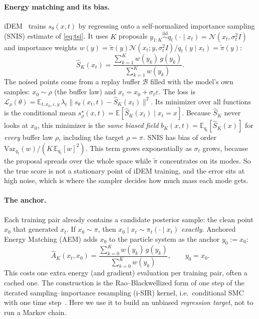 \paragraph{Energy matching and its bias.}
iDEM~\citep{akhound2024iterated} trains $s_\theta(x,t)$ by regressing onto a self-normalized importance sampling (SNIS) estimate of \eqref{eq:tsi}. It uses $K$ proposals $y_{1:K}\overset{\text{iid}}{\sim} q_t(\cdot\mid x_t)=\mathcal{N}(x_t,\sigma_t^2I)$ and importance weights $w(y)=\tilde\pi(y)\mathcal{N}(x_t;y,\sigma_t^2I)/q_t(y\mid x_t)=\tilde\pi(y)$:
\begin{equation}
\widehat S_K(x_t)=\frac{\sum_{k=1}^K w(y_k)\,g(y_k)}{\sum_{k=1}^K w(y_k)}.
\label{eq:snis}
\end{equation}
The noised points come from a replay buffer $\mathcal{B}$ filled with the model's own samples: $x_0\sim\rho$ (the buffer law) and $x_t=x_0+\sigma_t\varepsilon$.
The loss is $\mathcal{L}_\rho(\theta)=\mathbb{E}_{t,x_0,\varepsilon,y}\,\lambda_t\|s_\theta(x_t,t)-\widehat S_K(x_t)\|^2$.
Its minimizer over all functions is the conditional mean $s^\star_\rho(x,t)=\mathbb{E}[\widehat S_K(x_t)\mid x_t=x]$.
Because $\widehat S_K$ never looks at $x_0$, this minimizer is the \emph{same biased field} $b_K(x,t)=\mathbb{E}_{q_t}[\widehat S_K(x)]$ for \emph{every} buffer law $\rho$, including the target $\rho=\pi$.
SNIS has bias of order $\mathrm{Var}_{q_t}(w)/(K\,\mathbb{E}_{q_t}[w]^2)$. This term grows exponentially as $\sigma_t$ grows, because the proposal spreads over the whole space while $\tilde\pi$ concentrates on its modes.
So the true score is not a stationary point of iDEM training, and the error sits at high noise, which is where the sampler decides how much mass each mode gets.

\paragraph{The anchor.}
Each training pair already contains a candidate posterior sample: the clean point $x_0$ that generated $x_t$.
If $x_0\sim\pi$, then $x_0\mid x_t\sim\pi_t(\cdot\mid x_t)$ \emph{exactly}.
Anchored Energy Matching (AEM) adds $x_0$ to the particle system as the anchor $y_0:=x_0$:
\begin{equation}
\widehat A_K(x_t,x_0)=\frac{\sum_{k=0}^K w(y_k)\,g(y_k)}{\sum_{k=0}^K w(y_k)},\qquad y_0=x_0.
\label{eq:aem}
\end{equation}
This costs one extra energy (and gradient) evaluation per training pair, often a cached one.
The construction is the Rao--Blackwellized form of one step of the iterated sampling--importance resampling (i-SIR) kernel, i.e.\ conditional SMC with one time step~\citep{andrieu2010particle,andrieu2018uniform}.
Here we use it to build an unbiased \emph{regression target}, not to run a Markov chain.

